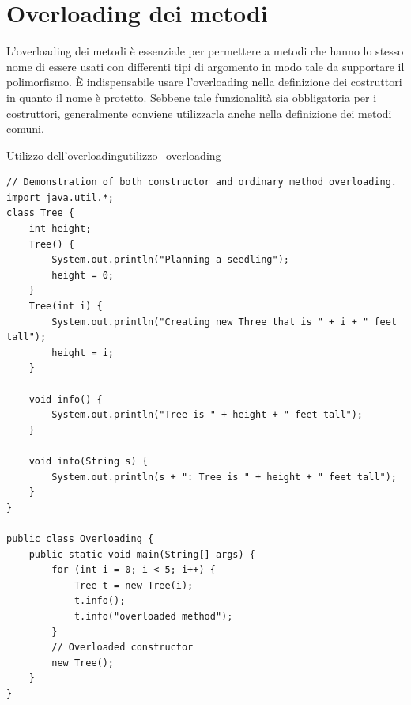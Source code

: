 \documentclass[12pt]{report}
\newcommand{\nmu}{}
\begin{document}
\section{Overloading dei metodi}
L'overloading dei metodi è essenziale per permettere a metodi che hanno lo stesso nome di essere usati con differenti tipi di argomento in modo tale da supportare il polimorfismo. È indispensabile usare l'overloading nella definizione dei costruttori in quanto il nome è protetto. Sebbene tale funzionalità sia obbligatoria per i costruttori, generalmente conviene utilizzarla anche nella definizione dei metodi comuni.
\begin{example}{\nmu Utilizzo dell'overloading}{utilizzo_overloading}
\begin{lstlisting}[style=javastyle]
// Demonstration of both constructor and ordinary method overloading.
import java.util.*;
class Tree {
	int height;
	Tree() {
		System.out.println("Planning a seedling");
		height = 0;
	}
	Tree(int i) {
		System.out.println("Creating new Three that is " + i + " feet tall");
		height = i;
	}

	void info() {
		System.out.println("Tree is " + height + " feet tall");
	}

	void info(String s) {
		System.out.println(s + ": Tree is " + height + " feet tall");
	}
}

public class Overloading {
	public static void main(String[] args) {
		for (int i = 0; i < 5; i++) {
			Tree t = new Tree(i);
			t.info();
			t.info("overloaded method");
		}
		// Overloaded constructor
		new Tree();
	}
}
\end{lstlisting}
\end{example}
\end{document}
